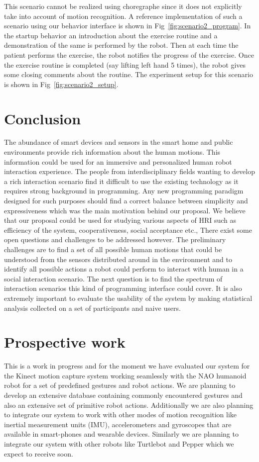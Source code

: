 \documentclass{llncs}
\begin{document}
	This scenario cannot be realized using choregraphe since it does not explicitly take into account of motion recognition. A reference implementation of such a scenario using our behavior interface is shown in Fig~\ref{fig:scenario2_program}. In the startup behavior an introduction about the exercise routine and a demonstration of the same is performed by the robot. Then at each time the patient performs the exercise, the robot notifies the progress of the exercise. Once the exercise routine is completed (say lifting left hand 5 times), the robot gives some closing comments about the routine. The experiment setup for this scenario is shown in Fig~\ref{fig:scenario2_setup}.
\section{Conclusion}
\quad The abundance of smart devices and sensors in the smart home and public environments provide rich information about the human motions. This information could be used for an immersive and personalized human robot interaction experience. The people from interdisciplinary fields wanting to develop a rich interaction scenario find it difficult to use the existing technology as it requires strong background in programming. Any new programming paradigm designed for such purposes should find a correct balance between simplicity and expressiveness which was the main motivation behind our proposal. We believe that our proposal could be used for studying various aspects of HRI such as efficiency of the system, cooperativeness, social acceptance etc., There exist some open questions and challenges to be addressed however. The preliminary challenges are to find a set of all possible human motions that could be understood from the sensors distributed around in the environment and to identify all possible actions a robot could perform to interact with human in a social interaction scenario. The next question is to find the spectrum of interaction scenarios this kind of programming interface could cover. It is also extremely important to evaluate the usability of the system by making statistical analysis collected on a set of participants and naive users.
\section{Prospective work}
\quad This is a work in progress and for the moment we have evaluated our system for the Kinect motion capture system working seamlessly with the NAO humanoid robot for a set of predefined gestures and robot actions. We are planning to develop an extensive database containing commonly encountered gestures and also an extensive set of primitive robot actions. Additionally we are also planning to integrate our system to work with other modes of motion recognition like inertial measurement units (IMU), accelerometers and gyroscopes that are available in smart-phones and wearable devices. Similarly we are planning to integrate our system with other robots like Turtlebot and Pepper which we expect to receive soon.
\end{document}
